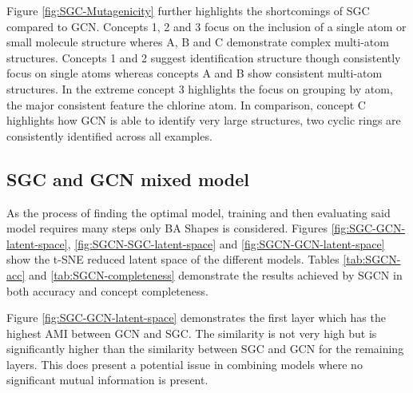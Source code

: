 Figure \ref{fig:SGC-Mutagenicity} further highlights the shortcomings of SGC compared to GCN.
Concepts 1, 2 and 3 focus on the inclusion of a single atom or small molecule structure wheres A, B and C demonstrate complex multi-atom structures.
Concepts 1 and 2 suggest identification structure though consistently focus on single atoms whereas concepts A and B show consistent multi-atom structures.
In the extreme concept 3 highlights the focus on grouping by atom, the major consistent feature the chlorine atom.
In comparison, concept C highlights how GCN is able to identify very large structures, two cyclic rings are consistently identified across all examples.

\subsection{SGC and GCN mixed model}
\label{sec:SGCN}



As the process of finding the optimal model, training and then evaluating said model requires many steps only BA Shapes is considered.
Figures \ref{fig:SGC-GCN-latent-space}, \ref{fig:SGCN-SGC-latent-space} and \ref{fig:SGCN-GCN-latent-space} show the t-SNE reduced latent space of the different models.
Tables \ref{tab:SGCN-acc} and \ref{tab:SGCN-completeness} demonstrate the results achieved by SGCN in both accuracy and concept completeness.

Figure \ref{fig:SGC-GCN-latent-space} demonstrates the first layer which has the highest AMI between GCN and SGC.
The similarity is not very high but is significantly higher than the similarity between SGC and GCN for the remaining layers.
This does present a potential issue in combining models where no significant mutual information is present.

